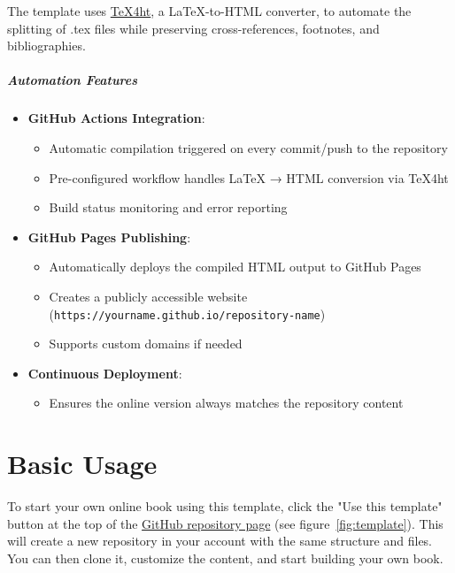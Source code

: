 \documentclass{book}
\begin{document}
The template uses \href{https://tug.org/tex4ht/}{TeX4ht}, a LaTeX-to-HTML converter, to automate the
splitting of .tex files while preserving cross-references, footnotes, and
bibliographies. 

\paragraph{Automation Features}
\begin{itemize}
    \item \textbf{GitHub Actions Integration}: 
    \begin{itemize}
        \item Automatic compilation triggered on every commit/push to the repository
        \item Pre-configured workflow handles LaTeX → HTML conversion via \TeX4ht
        \item Build status monitoring and error reporting
    \end{itemize}
    
    \item \textbf{GitHub Pages Publishing}:
    \begin{itemize}
        \item Automatically deploys the compiled HTML output to GitHub Pages
        \item Creates a publicly accessible website (\texttt{https://yourname.github.io/repository-name})
        \item Supports custom domains if needed
    \end{itemize}
    
    \item \textbf{Continuous Deployment}:
    \begin{itemize}
        \item Ensures the online version always matches the repository content
    \end{itemize}
\end{itemize}

\chapter{Basic Usage}

To start your own online book using this template, click the "Use this
template" button at the top of the
\href{git@github.com:michal-h21/tex4ht-booksite.git}{GitHub repository page} (see figure~\ref{fig:template}).
This will create a new repository in your account with the same structure and
files. You can then clone it, customize the content, and start building your
own book.
\end{document}
